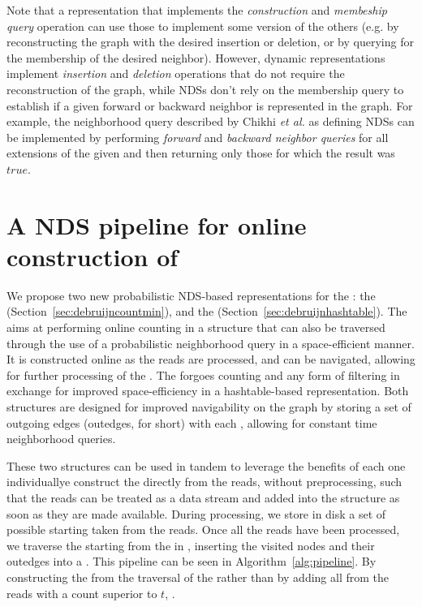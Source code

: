 Note that a representation that implements the \emph{construction} and \emph{membeship query} operation can use those to implement some version of the others (e.g. by reconstructing the graph with the desired insertion or deletion, or by querying for the membership of the desired neighbor). However, dynamic representations implement \emph{insertion} and \emph{deletion} operations that do not require the reconstruction of the graph, while NDSs don't rely on the membership query to establish if a given forward or backward neighbor is represented in the graph. For example, the neighborhood query described by Chikhi \emph{et al.} \cite{???} as defining NDSs can be implemented by performing \emph{forward} and \emph{backward neighbor queries} for all extensions of the given \kmer and then returning only those for which the result was $\mathit{true}$.



\section{A NDS pipeline for online construction of }\label{sec:pipeline}

We propose two new probabilistic NDS-based representations for the \dBG: the \keyterm{\dB \cm} \dBCM (Section~\ref{sec:debruijncountmin}), and the  \dBHT (Section~\ref{sec:debruijnhashtable}). The \dBCM aims at performing online \kmer counting in a structure that can also be traversed through the use of a probabilistic neighborhood query in a space-efficient manner. It is constructed online as the reads are processed, and can be navigated, allowing for further processing of the \dBG. The \dBHT forgoes \kmer counting and any form of filtering in exchange for improved space-efficiency in a hashtable-based representation. Both structures are designed for improved navigability on the graph by storing a set of outgoing edges (outedges, for short) with each \kmer, allowing for constant time neighborhood queries. 

These two structures can be used in tandem to leverage the benefits of each one individuallye construct the \dBCM directly from the reads, without preprocessing, such that the reads can be treated as a data stream and added into the structure as soon as they are made available. During processing, we store in disk a set of possible starting   taken from the reads. Once all the reads have been processed, we traverse the \dBCM starting from the  in , inserting the visited nodes and their outedges into a \dBHT. This pipeline can be seen in Algorithm~\ref{alg:pipeline}. By constructing the \dBHT from the traversal of the \dBCM rather than by adding all  from the reads with a count superior to $t$, .

